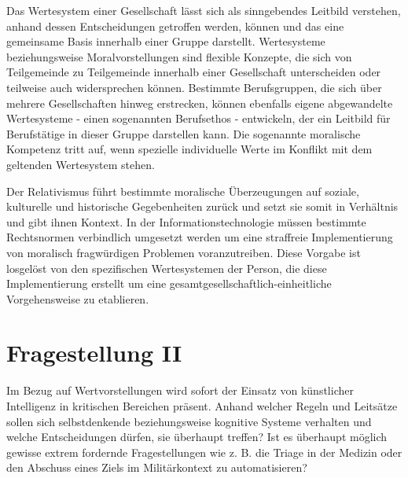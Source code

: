 \documentclass[journal]{IEEEtran}
\begin{document}
\begin{onecolumn}
Das Wertesystem einer Gesellschaft lässt sich als sinngebendes Leitbild verstehen, anhand dessen 
Entscheidungen getroffen werden, können und das eine gemeinsame Basis innerhalb einer Gruppe darstellt. 
Wertesysteme beziehungsweise Moralvorstellungen sind flexible Konzepte, die sich von Teilgemeinde zu 
Teilgemeinde innerhalb einer Gesellschaft unterscheiden oder teilweise auch widersprechen können. 
Bestimmte Berufsgruppen, die sich über mehrere Gesellschaften hinweg erstrecken, können ebenfalls eigene 
abgewandelte Wertesysteme - einen sogenannten Berufsethos - entwickeln, der ein Leitbild für Berufstätige 
in dieser Gruppe darstellen kann.
Die sogenannte moralische Kompetenz tritt auf, wenn spezielle individuelle Werte im Konflikt mit dem 
geltenden Wertesystem stehen.

Der Relativismus führt bestimmte moralische Überzeugungen auf soziale, kulturelle und historische
Gegebenheiten zurück und setzt sie somit in Verhältnis und gibt ihnen Kontext.
In der Informationstechnologie müssen bestimmte Rechtsnormen verbindlich umgesetzt werden um eine 
straffreie Implementierung von moralisch fragwürdigen Problemen voranzutreiben. Diese Vorgabe ist
losgelöst von den spezifischen Wertesystemen der Person, die diese Implementierung erstellt um eine
gesamtgesellschaftlich-einheitliche Vorgehensweise zu etablieren.

\section*{Fragestellung II}

Im Bezug auf Wertvorstellungen wird sofort der Einsatz von künstlicher Intelligenz in kritischen 
Bereichen präsent. Anhand welcher Regeln und Leitsätze sollen sich selbstdenkende beziehungsweise 
kognitive Systeme verhalten und welche Entscheidungen dürfen, sie überhaupt treffen? Ist es überhaupt 
möglich gewisse extrem fordernde Fragestellungen wie z. B. die Triage in der Medizin oder den Abschuss 
eines Ziels im Militärkontext zu automatisieren?

\end{onecolumn}
\end{document}

